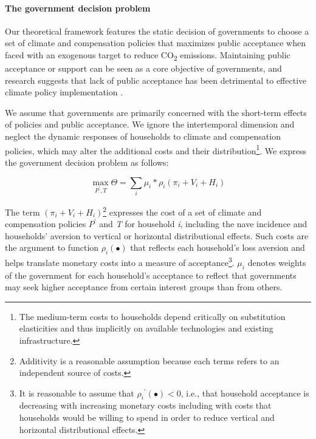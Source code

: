 \documentclass[12pt, a4paper]{article}
\begin{document}
\paragraph{The government decision problem}
Our theoretical framework features the static decision of governments to choose a set of climate and compensation policies that maximizes public acceptance when faced with an exogenous target to reduce CO\textsubscript{2} emissions. Maintaining public acceptance or support can be seen as a core objective of governments, and research suggests that lack of public acceptance has been detrimental to effective climate policy implementation \autocite{Carattini.2018,Bergquist.2022,Douenne.2022}.

We assume that governments are primarily concerned with the short-term effects of policies and public acceptance. We ignore the intertemporal dimension and neglect the dynamic responses of households to climate and compensation policies, which may alter the additional costs and their distribution\footnote{The medium-term costs to households depend critically on substitution elasticities and thus implicitly on available technologies and existing infrastructure.}. We express the government decision problem as follows:  

\begin{equation} \label{eq:theta}
    \max_{P^{\prime},T} \Theta = \sum_{i} \mu_{i} * \rho_{i}(\pi_{i} + V_{i} + H_{i})
\end{equation}

The term $(\pi_{i} + V_{i} + H_{i})$\footnote{Additivity is a reasonable assumption because each terms refers to an independent source of costs.} expresses the cost of a set of climate and compensation policies $P^{\prime}$ and \textit{T} for household \textit{i}, including the nave incidence and households' aversion to vertical or horizontal distributional effects. Such costs are the argument to function $\rho_{i}(\bullet)$ that reflects each household's loss aversion \autocite{Tversky.1991} and helps translate monetary costs into a measure of acceptance\footnote{It is reasonable to assume that ${\rho_{i}}^{\prime}(\bullet)<0$, i.e., that household acceptance is decreasing with increasing monetary costs including with costs that households would be willing to spend in order to reduce vertical and horizontal distributional effects.}. $\mu_{i}$ denotes weights of the government for each household's acceptance to reflect that governments may seek higher acceptance from certain interest groups than from others.
\end{document}
